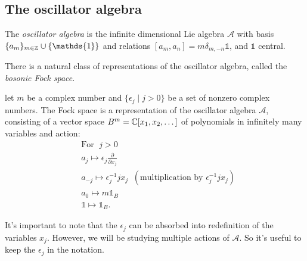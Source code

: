 \subsection{The oscillator algebra}
\begin{dang}
    \begin{definition}\cite{kac2013bombay}
        The \textit{oscillator algebra} is the infinite dimensional Lie algebra $\mathcal{A}$ with basis $\{a_{m}\}_{m\in\bb{Z}}\cup\{\mathds{1}\}$ and relations $[a_m,a_n]=m\delta_{m,-n}\mathds{1}$, and $\mathds{1}$ central.
    \end{definition}
\end{dang}
There is a natural class of representations of the oscillator algebra, called the \textit{bosonic Fock space}.
\begin{dang}
    \begin{definition}\cite{kac2013bombay}
        let $m$ be a complex number and $\{\epsilon_j\;|\;j>0\}$ be a set of nonzero complex numbers. The Fock space is a representation of the oscillator algebra $\mathcal{A}$, consisting of a vector space $B^m=\mathbb{C}[x_1,x_2,\dots]$ of polynomials in infinitely many variables and action:
        \begin{equation}
            \begin{split}
                &\text{For }\;j >0\\
                &a_j\mapsto \epsilon_j\frac{\partial}{\partial x_j}\\
                &a_{-j}\mapsto \epsilon_j^{-1}jx_j\;\;(\text{multiplication by }\epsilon_j^{-1}jx_j)\\
                &a_0\mapsto m\mathds{1}_B\\
                &\mathds{1}\mapsto \mathds{1}_B.
            \end{split}
        \end{equation}
    \end{definition}
\end{dang}

\begin{dang}
    \begin{remark}
        It's important to note that the $\epsilon_j$ can be absorbed into redefinition of the variables $x_j$. However, we will be studying multiple actions of $\mathcal{A}$. So it's useful to keep the $\epsilon_j$ in the notation.
    \end{remark}
\end{dang}


